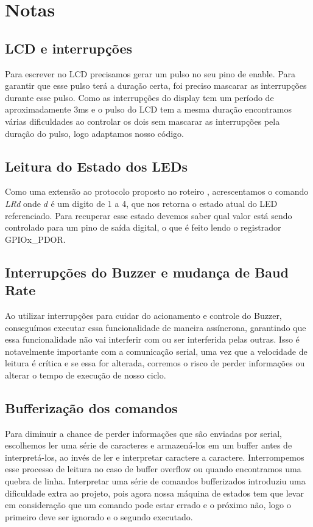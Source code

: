\documentclass{article}
\begin{document}
\section{Notas}
\subsection{LCD e interrupções}
Para escrever no LCD precisamos gerar um pulso no seu pino de enable. Para garantir que esse pulso terá a duração certa, foi preciso mascarar as interrupções durante esse pulso. Como as interrupções do display tem um período de aproximadamente 3ms e o pulso do LCD tem a mesma duração encontramos várias dificuldades ao controlar os dois sem mascarar as interrupções pela duração do pulso, logo adaptamos nosso código.

\subsection{Leitura do Estado dos LEDs}
Como uma extensão ao protocolo proposto no roteiro \cite{bb:roteiro}, acrescentamos o comando \textit{LRd} onde $d$ é um digito de 1 a 4, que nos retorna o estado atual do LED referenciado. Para recuperar esse estado devemos saber qual valor está sendo controlado para um pino de saída digital, o que é feito lendo o registrador GPIOx\_PDOR.

\subsection{Interrupções do Buzzer e mudança de Baud Rate}
Ao utilizar interrupções para cuidar do acionamento e controle do Buzzer, conseguímos executar essa funcionalidade de maneira assíncrona, garantindo que essa funcionalidade não vai interferir com ou ser interferida pelas outras. Isso é notavelmente importante com a comunicação serial, uma vez que a velocidade de leitura é crítica e se essa for alterada, corremos o risco de perder informações ou alterar o tempo de execução de nosso ciclo.

\subsection{Bufferização dos comandos}
Para diminuir a chance de perder informações que são enviadas por serial, escolhemos ler uma série de caracteres e armazená-los em um buffer antes de interpretá-los, ao invés de ler e interpretar caractere a caractere. Interrompemos esse processo de leitura no caso de buffer overflow ou quando encontramos uma quebra de linha. Interpretar uma série de comandos bufferizados introduziu uma dificuldade extra ao projeto, pois agora nossa máquina de estados tem que levar em consideração que um comando pode estar errado e o próximo não, logo o primeiro deve ser ignorado e o segundo executado.
\end{document}
